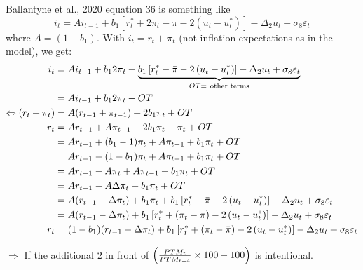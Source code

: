 \documentclass[a4paper,12pt]{article}
\begin{document}
Ballantyne et al., 2020 equation 36 is something like%
\begin{equation*}
i_{t}=Ai_{t-1}+b_{1}\left[ r_{t}^{\ast }+2\pi _{t}-\bar{\pi}-2\left(
u_{t}-u_{t}^{\ast }\right) \right] -\Delta _{2}u_{t}+\sigma _{8}\varepsilon
_{t}
\end{equation*}%
where $A=(1-b_{1})$. With $i_{t}=r_{t}+\pi _{t}$ (not inflation expectations
as in the model), we get:%
\begin{align}
i_{t}& =Ai_{t-1}+b_{1}2\pi _{t}+\underbrace{b_{1}\left[ r_{t}^{\ast }-\bar{%
\pi}-2\left( u_{t}-u_{t}^{\ast }\right) \right] -\Delta _{2}u_{t}+\sigma
_{8}\varepsilon _{t}}_{OT=~\text{other terms}}  \notag \\
& =Ai_{t-1}+b_{1}2\pi _{t}+OT  \notag \\
\Leftrightarrow (r_{t}+\pi _{t})& =A(r_{t-1}+\pi _{t-1})+2b_{1}\pi _{t}+OT
\notag \\
r_{t}& =Ar_{t-1}+A\pi _{t-1}+2b_{1}\pi _{t}-\pi _{t}+OT  \notag \\
& =Ar_{t-1}+(b_{1}-1)\pi _{t}+A\pi _{t-1}+b_{1}\pi _{t}+OT  \notag \\
& =Ar_{t-1}-(1-b_{1})\pi _{t}+A\pi _{t-1}+b_{1}\pi _{t}+OT  \notag \\
& =Ar_{t-1}-A\pi _{t}+A\pi _{t-1}+b_{1}\pi _{t}+OT  \notag \\
& =Ar_{t-1}-A\Delta \pi _{t}+b_{1}\pi _{t}+OT  \notag \\
& =A(r_{t-1}-\Delta \pi _{t})+b_{1}\pi _{t}+b_{1}\left[ r_{t}^{\ast }-\bar{%
\pi}-2\left( u_{t}-u_{t}^{\ast }\right) \right] -\Delta _{2}u_{t}+\sigma
_{8}\varepsilon _{t}  \notag \\
& =A(r_{t-1}-\Delta \pi _{t})+b_{1}\left[ r_{t}^{\ast }+(\pi _{t}-\bar{\pi}%
)-2\left( u_{t}-u_{t}^{\ast }\right) \right] -\Delta _{2}u_{t}+\sigma
_{8}\varepsilon _{t}  \notag \\
r_{t}& =(1-b_{1})(r_{t-1}-\Delta \pi _{t})+b_{1}\left[ r_{t}^{\ast }+(\pi
_{t}-\bar{\pi})-2\left( u_{t}-u_{t}^{\ast }\right) \right] -\Delta
_{2}u_{t}+\sigma _{8}\varepsilon _{t}
\end{align}

$\Rightarrow $ If the additional $2$ in front of $\left( \frac{PTM_{t}}{%
PTM_{t-4}}\times 100-100\right) $ is intentional.

\bigskip

\bigskip
\end{document}
